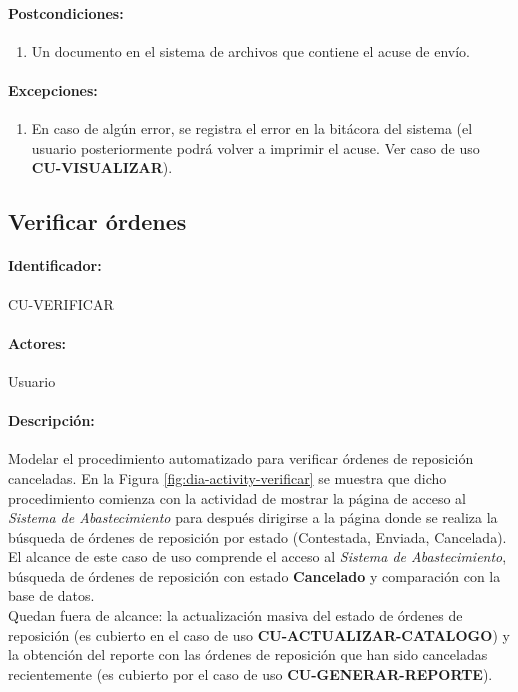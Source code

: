 \paragraph{Postcondiciones:}
\begin{enumerate}
  \item Un documento en el sistema de archivos que contiene el acuse de envío.
\end{enumerate}
\paragraph{Excepciones:}
\begin{enumerate}
  \item En caso de algún error, se registra el error en la bitácora del sistema (el usuario posteriormente podrá volver a imprimir el acuse. Ver caso de uso \textbf{CU-VISUALIZAR}).
\end{enumerate}


\subsection{Verificar órdenes}\label{cu-verificar}
\paragraph{Identificador:}
CU-VERIFICAR
\paragraph{Actores:}
Usuario
\paragraph{Descripción:}
Modelar el procedimiento automatizado para verificar órdenes de reposición canceladas. En la Figura \ref{fig:dia-activity-verificar} se muestra que dicho procedimiento comienza con la actividad de mostrar la página de acceso al \textit{Sistema de Abastecimiento} para después dirigirse a la página donde se realiza la búsqueda de órdenes de reposición por estado (Contestada, Enviada, Cancelada).\\
El alcance de este caso de uso comprende el acceso al \textit{Sistema de Abastecimiento}, búsqueda de órdenes de reposición con estado \textbf{Cancelado} y comparación con la base de datos.\\
Quedan fuera de alcance: la actualización masiva del estado de órdenes de reposición (es cubierto en el caso de uso \textbf{CU-ACTUALIZAR-CATALOGO}) y la obtención del reporte con las órdenes de reposición que han sido canceladas recientemente (es cubierto por el caso de uso \textbf{CU-GENERAR-REPORTE}).
